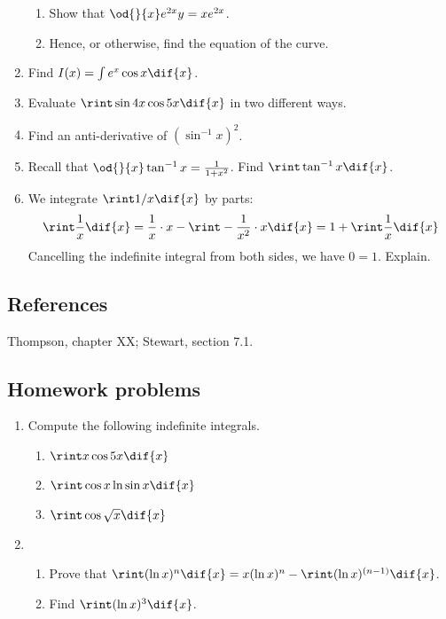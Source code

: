 \begin{enumerate}
\begin{enumerate}
          \item Show that $ \od{}{x} e^{2x} y = xe^{2x} $.
          \item Hence, or otherwise, find the equation of the curve.
        \end{enumerate}
  \item Find $ I(x) = \int e^x \cos x \dif{x} $.
  \item Evaluate $ \rint \sin 4x \cos 5x \dif{x} $ in two different ways.
  \item Find an anti-derivative of $ (\sin^{-1} x)^2 $.
  \item Recall that $ \od{}{x} \tan^{-1} x = \frac{1}{1 + x^2} $. Find $ \rint \tan^{-1} x \dif{x} $.
  \item We integrate $ \rint 1/x \dif{x} $ by parts:
        \begin{align*}
          \rint \frac{1}{x} \dif{x} = \frac{1}{x} \cdot x - \rint -\frac{1}{x^2} \cdot x \dif{x} = 1 + \rint \frac{1}{x} \dif{x}
        \end{align*}
        Cancelling the indefinite integral from both sides, we have $ 0 = 1 $. Explain.
\end{enumerate}

\subsection{References}
Thompson, chapter XX; Stewart, section 7.1.

\subsection{Homework problems}
\begin{enumerate}
  \item Compute the following indefinite integrals.
    \begin{enumerate}
      \item $ \rint x \cos 5x \dif{x} $
      \item $ \rint \cos x \ln \sin x \dif{x} $
      \item $ \rint \cos \sqrt{x} \dif{x} $
    \end{enumerate}
  \item
    \begin{enumerate}
      \item Prove that $ \rint (\ln x)^n \dif{x} = x(\ln x)^n - \rint (\ln x)^{(n-1)} \dif{x} $.
      \item Find $ \rint (\ln x)^3 \dif{x} $.
    \end{enumerate}
\end{enumerate}
